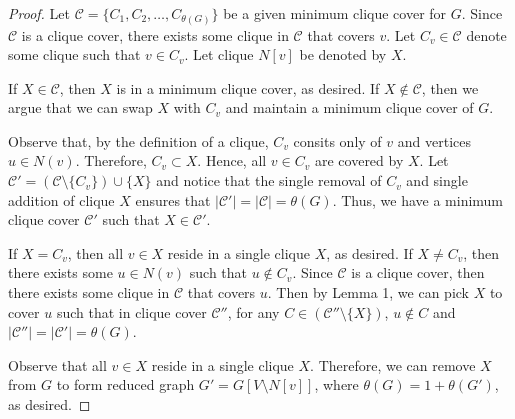\documentclass[../techreport.tex]{subfiles}
\begin{document}
\begin{proof}
	Let $\mathcal{C} = \{C_1, C_2, \dots, C_{\theta(G)}\}$ be a given minimum clique cover for $G$. Since $\mathcal{C}$ is a clique cover, there exists some clique in $\mathcal{C}$ that covers $v$. Let $C_v \in \mathcal{C}$ denote some clique such that $v \in C_v$. Let clique $N[v]$ be denoted by $X$.

	If $X \in \mathcal{C}$, then $X$ is in a minimum clique cover, as desired. If $X \notin \mathcal{C}$, then we argue that we can swap $X$ with $C_v$ and maintain a minimum clique cover of $G$.

	Observe that, by the definition of a clique, $C_v$ consits only of $v$ and vertices $u \in N(v)$. Therefore, $C_v \subset X$. Hence, all $v \in C_v$ are covered by $X$. Let $\mathcal{C'} = (\mathcal{C} \setminus \{C_v\}) \cup \{X\}$ and notice that the single removal of $C_v$ and single addition of clique $X$ ensures that $|\mathcal{C'}| = |\mathcal{C}| = \theta(G)$. Thus, we have a minimum clique cover $\mathcal{C'}$ such that $X \in \mathcal{C'}$.

	If $X = C_v$, then all $v \in X$ reside in a single clique $X$, as desired. If $X \neq C_v$, then there exists some $u \in N(v)$ such that $u \notin C_v$. Since $\mathcal{C}$ is a clique cover, then there exists some clique in $\mathcal{C}$ that covers $u$. Then by Lemma 1, we can pick $X$ to cover $u$ such that in clique cover $\mathcal{C''}$, for any $C \in (\mathcal{C''} \setminus \{X\})$, $u \notin C$ and $|\mathcal{C''}| = |\mathcal{C'}| = \theta(G)$.


	Observe that all $v \in X$ reside in a single clique $X$. Therefore, we can remove $X$ from $G$ to form reduced graph $G' = G[V \setminus N[v]]$, where $\theta(G) = 1 + \theta(G')$, as desired.
\end{proof}
\end{document}
